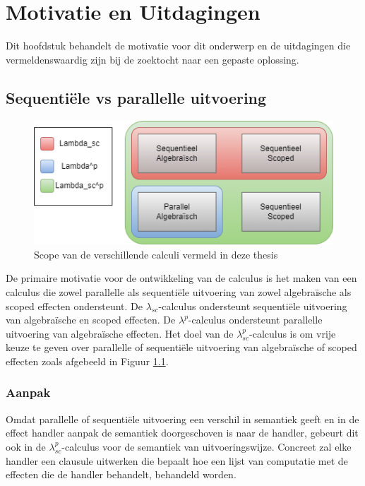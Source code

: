 \chapter{Motivatie en Uitdagingen}
\label{hoofdstuk:motivatie}
Dit hoofdstuk behandelt de motivatie voor dit onderwerp en de uitdagingen die vermeldenswaardig zijn bij de zoektocht naar een gepaste oplossing.

\section{Sequentiële vs parallelle uitvoering}

\begin{figure}
    \centering
    \includegraphics[width=\textwidth]{Media/scope.png}
    \caption{Scope van de verschillende calculi vermeld in deze thesis}
    \label{fig:motiv}
\end{figure}

De primaire motivatie voor de ontwikkeling van de calculus is het maken van een calculus die zowel parallelle als sequentiële uitvoering van zowel algebraïsche als scoped effecten ondersteunt. De $\lambda_{sc}$-calculus \cite{Bosman2022} ondersteunt sequentiële uitvoering van algebraïsche en scoped effecten. De $\lambda^{p}$-calculus ondersteunt parallelle uitvoering van algebraïsche effecten. Het doel van de $\lambda_{sc}^{p}$-calculus is om vrije keuze te geven over parallelle of sequentiële uitvoering van algebraïsche of scoped effecten zoals afgebeeld in Figuur \ref{fig:motiv}. 

\subsection{Aanpak}
Omdat parallelle of sequentiële uitvoering een verschil in semantiek geeft en in de effect handler aanpak de semantiek doorgeschoven is naar de handler, gebeurt dit ook in de $\lambda_{sc}^{p}$-calculus voor de semantiek van uitvoeringswijze. Concreet zal elke handler een clausule uitwerken die bepaalt hoe een lijst van computatie met de effecten die de handler behandelt, behandeld worden.

